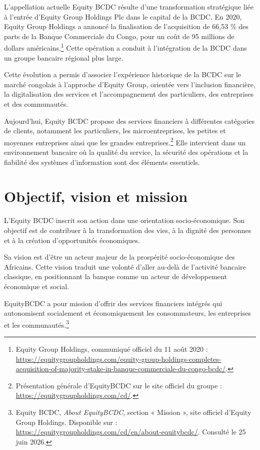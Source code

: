 \documentclass[12pt,a4paper]{report}
\begin{document}
L'appellation actuelle Equity BCDC résulte d'une transformation stratégique liée à l'entrée d'Equity Group Holdings Plc dans le capital de la BCDC. En 2020, Equity Group Holdings a annoncé la finalisation de l'acquisition de 66,53 \% des parts de la Banque Commerciale du Congo, pour un coût de 95 millions de dollars américains.\footnote{Equity Group Holdings, communiqué officiel du 11 août 2020 : 
\url{https://equitygroupholdings.com/equity-group-holdings-completes-acquisition-of-majority-stake-in-banque-commerciale-du-congo-bcdc/}.} Cette opération a conduit à l'intégration de la BCDC dans un groupe bancaire régional plus large.

Cette évolution a permis d'associer l'expérience historique de la BCDC sur le marché congolais à l'approche d'Equity Group, orientée vers l'inclusion financière, la digitalisation des services et l'accompagnement des particuliers, des entreprises et des communautés.

Aujourd'hui, Equity BCDC propose des services financiers à différentes catégories de clients, notamment les particuliers, les microentreprises, les petites et moyennes entreprises ainsi que les grandes entreprises.\footnote{Présentation générale d'EquityBCDC sur le site officiel du groupe : \url{https://equitygroupholdings.com/cd/}.} Elle intervient dans un environnement bancaire où la qualité du service, la sécurité des opérations et la fiabilité des systèmes d'information sont des éléments essentiels.

\section{Objectif, vision et mission}

L'Equity BCDC inscrit son action dans une orientation socio-économique. Son objectif est de contribuer à la transformation des vies, à la dignité des personnes et à la création d'opportunités économiques.

Sa vision est d'être un acteur majeur de la prospérité socio-économique des Africains. Cette vision traduit une volonté d'aller au-delà de l'activité bancaire classique, en positionnant la banque comme un acteur de développement économique et social.

EquityBCDC a pour mission d'offrir des services financiers intégrés qui autonomisent socialement et économiquement les consommateurs, les entreprises et les communautés.\footnote{Equity BCDC, \textit{About EquityBCDC}, section « Mission », site officiel d'Equity Group Holdings. Disponible sur : \url{https://equitygroupholdings.com/cd/en/about-equitybcdc/}. Consulté le 25 juin 2026.}
\end{document}
